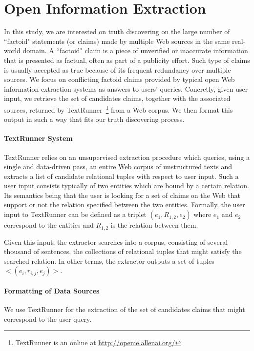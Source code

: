 \section{Open Information Extraction}

In this study, we are interested on truth discovering on the large number of ``factoid" statements
(or claims) made by multiple Web sources in the same real-world domain. A ``factoid" claim is
a piece of unverified or inaccurate information that is presented as factual, often
as part of a publicity effort. Such type of claims  is usually accepted as true  because of its
frequent redundancy over multiple sources. We focus on conflicting factoid claims provided by typical 
open Web information extraction systems as answers to users' queries. Concretly, given user input, 
we retrieve the set of candidates claims, together with the associated sources, returned by TextRunner~\footnote{TextRunner is an online
at \href{http://openie.allenai.org/}{http://openie.allenai.org/}}
from a Web corpus. We then format this output in such a way that fits our truth discovering process.



\paragraph*{TextRunner System}
TextRunner relies on an unsupervised extraction procedure which queries, using a single and data-driven 
pass, an entire Web corpus of unstructured texts and extracts a list of candidate relational tuples with 
respect to user input. Such a user input consists typically of two entities which are bound by a certain 
relation. Its semantics being that the user is looking for a set of claims on the Web that support or not
the relation specified between the two entities. Formally, the user input to TextRunner can be defined as a triplet $(e_1, R_{1,2}, e_2)$ 
where $e_1$ and $e_2$ correspond to the entities and $R_{1,2}$ is the relation between them. 

Given this input, the extractor searches into a corpus, consisting
of several thousand of sentences, the collections of relational tuples that might satisfy the searched relation.
In other terms, the extractor outputs a set of tuples $<(e_i, r_{i,j}, e_j)>$.

\paragraph*{Formatting of Data Sources}
We use TextRunner for the extraction of the set of 
candidates claims that might correspond to the user query.